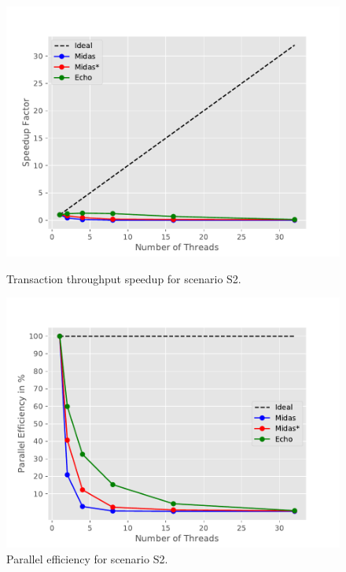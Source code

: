 \begin{figure}[h!]
\begin{minipage}[l]{0.50\textwidth}
    \includegraphics[width=\textwidth]{figures/bench/spd-sl}
    \caption{Transaction throughput speedup for scenario S2.}
    \label{fig:spd-s2}
\end{minipage}
\begin{minipage}[l]{0.50\textwidth}
    \includegraphics[width=\textwidth]{figures/bench/eff-sl}
    \caption{Parallel efficiency for scenario S2.}

\end{minipage}
\end{figure}
